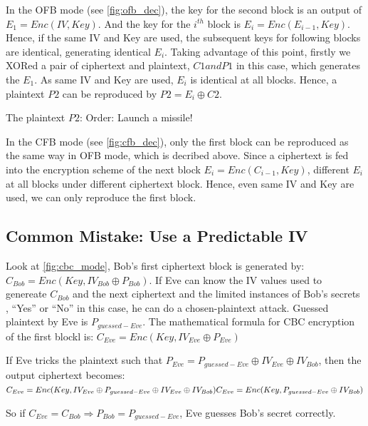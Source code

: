 In the OFB mode (see \autoref{fig:ofb_dec}), the key for the second block is an output
of \(E_{1} = Enc(IV,Key)\). And the key for the \(i^{th}\) block is \(E_{i}
= Enc(E_{i-1},Key)\). Hence, if the same IV and Key are used, the subsequent keys
for following blocks are identical, generating identical \(E_{i}\). Taking advantage of
this point, firstly we XORed a pair of ciphertext and plaintext, \(C1 and P1\) in this
case, which generates the \(E_1\). As same IV and Key are used, \(E_i\) is identical at
all blocks. Hence, a plaintext \(P2\) can be reproduced by \(P2 = E_i \oplus C2\).

The plaintext \(P2\): {\selectfont Order: Launch a missile!}

In the CFB mode (see \autoref{fig:cfb_dec}), only the first block can be reproduced as
the same way in OFB mode, which is decribed above. Since a ciphertext is fed into the
encryption scheme of the next block \(E_i = Enc(C_{i-1},Key)\), different \(E_i\)
at all blocks under different ciphertext block. Hence, even same IV and Key are used,
we can only reproduce the first block.

\subsection{Common Mistake: Use a Predictable IV}
%
Look at \autoref{fig:cbc_mode}, Bob's first ciphertext block is generated by: \(C_{Bob}
=Enc(Key, IV_{Bob} \oplus P_{Bob})\). If Eve can know the IV values used to genereate
\(C_{Bob}\) and the next ciphertext and the limited instances of Bob's secrets
, ``Yes'' or ``No'' in this case, he can do a chosen-plaintext attack. Guessed
plaintext by Eve is \(P_{guessed-Eve}\). The mathematical formula for CBC encryption
of the first blockl is:
\begin{math}
    C_{Eve} = Enc(Key, IV_{Eve} \oplus P_{Eve})
\end{math}

If Eve tricks the plaintext such that \(P_{Eve} = P_{guessed-Eve} \oplus IV_{Eve}
\oplus IV_{Bob}\), then the output ciphertext becomes:
\begin{math}
    C_{Eve} = Enc(Key, IV_{Eve} \oplus P_{guessed-Eve} \oplus IV_{Eve}
    \oplus IV_{Bob})\\
    C_{Eve} = Enc(Key, P_{guessed-Eve} \oplus IV_{Bob})
\end{math}

So if \(C_{Eve}=C_{Bob} \Rightarrow P_{Bob}=P_{guessed-Eve}\), Eve guesses Bob's
secret correctly.

